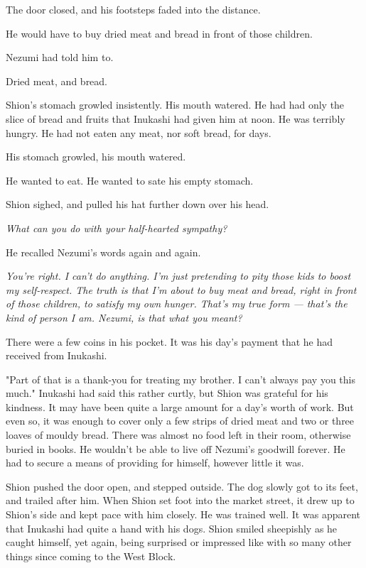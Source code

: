 The door closed, and his footsteps faded into the distance.

He would have to buy dried meat and bread in front of those children.

Nezumi had told him to.

Dried meat, and bread.

Shion's stomach growled insistently. His mouth watered. He had had only
the slice of bread and fruits that Inukashi had given him at noon. He
was terribly hungry. He had not eaten any meat, nor soft bread, for
days.

His stomach growled, his mouth watered.

He wanted to eat. He wanted to sate his empty stomach.

Shion sighed, and pulled his hat further down over his head.

\emph{What can you do with your half-hearted sympathy?}

He recalled Nezumi's words again and again.

\emph{You're right. I can't do anything. I'm just pretending to pity those
kids to boost my self-respect. The truth is that I'm about to buy meat
and bread, right in front of those children, to satisfy my own hunger.
That's my true form --- that's the kind of person I am. Nezumi, is that
what you meant?}

There were a few coins in his pocket. It was his day's payment that he
had received from Inukashi.

"Part of that is a thank-you for treating my brother. I can't always pay
you this much." Inukashi had said this rather curtly, but Shion was
grateful for his kindness. It may have been quite a large amount for a
day's worth of work. But even so, it was enough to cover only a few
strips of dried meat and two or three loaves of mouldy bread. There was
almost no food left in their room, otherwise buried in books. He
wouldn't be able to live off Nezumi's goodwill forever. He had to secure
a means of providing for himself, however little it was.

Shion pushed the door open, and stepped outside. The dog slowly got to
its feet, and trailed after him. When Shion set foot into the market
street, it drew up to Shion's side and kept pace with him closely. He
was trained well. It was apparent that Inukashi had quite a hand with
his dogs. Shion smiled sheepishly as he caught himself, yet again, being
surprised or impressed like with so many other things since coming to
the West Block.

